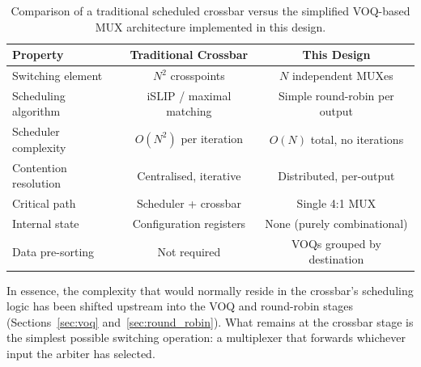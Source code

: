\begin{table}[htbp]
    \centering
    \caption{Comparison of a traditional scheduled crossbar versus the simplified 
    VOQ-based MUX architecture implemented in this design.}
    \label{tab:crossbar_comparison}
    \renewcommand{\arraystretch}{1.3}
    \begin{tabular}{l c c}
        \hline
        \textbf{Property} & \textbf{Traditional Crossbar} & \textbf{This Design} \\
        \hline
        Switching element     & $N^2$ crosspoints              & $N$ independent MUXes \\
        Scheduling algorithm  & iSLIP / maximal matching       & Simple round-robin per output \\
        Scheduler complexity  & $O(N^2)$ per iteration         & $O(N)$ total, no iterations \\
        Contention resolution & Centralised, iterative         & Distributed, per-output \\
        Critical path         & Scheduler + crossbar           & Single 4:1 MUX \\
        Internal state        & Configuration registers        & None (purely combinational) \\
        Data pre-sorting      & Not required                   & VOQs grouped by destination \\
        \hline
    \end{tabular}
\end{table}

In essence, the complexity that would normally reside in the crossbar's scheduling logic 
has been shifted upstream into the VOQ and round-robin stages (Sections~\ref{sec:voq} 
and~\ref{sec:round_robin}). What remains at the crossbar stage is the simplest possible 
switching operation: a multiplexer that forwards whichever input the arbiter has selected.